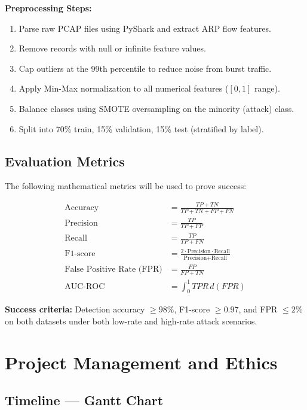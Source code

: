 \documentclass[12pt,a4paper]{article}
\begin{document}
\textbf{Preprocessing Steps:}
\begin{enumerate}[itemsep=2pt]
    \item Parse raw PCAP files using PyShark and extract ARP flow features.
    \item Remove records with null or infinite feature values.
    \item Cap outliers at the 99th percentile to reduce noise from burst traffic.
    \item Apply Min-Max normalization to all numerical features ($[0,1]$ range).
    \item Balance classes using SMOTE oversampling on the minority (attack) class.
    \item Split into 70\% train, 15\% validation, 15\% test (stratified by label).
\end{enumerate}

\subsection{Evaluation Metrics}

The following mathematical metrics will be used to prove success:

\begin{align}
    \text{Accuracy} &= \frac{TP + TN}{TP + TN + FP + FN} \\[6pt]
    \text{Precision} &= \frac{TP}{TP + FP} \\[6pt]
    \text{Recall} &= \frac{TP}{TP + FN} \\[6pt]
    \text{F1-score} &= \frac{2 \cdot \text{Precision} \cdot \text{Recall}}
                           {\text{Precision} + \text{Recall}} \\[6pt]
    \text{False Positive Rate (FPR)} &= \frac{FP}{FP + TN} \\[6pt]
    \text{AUC-ROC} &= \int_{0}^{1} TPR\, d(FPR)
\end{align}

\noindent
\textbf{Success criteria:} Detection accuracy $\geq 98\%$, F1-score $\geq 0.97$,
and FPR $\leq 2\%$ on both datasets under both low-rate and high-rate attack scenarios.

\section{Project Management and Ethics}

\subsection{Timeline --- Gantt Chart}
\end{document}
